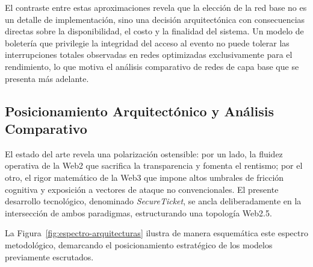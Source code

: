 El contraste entre estas aproximaciones revela que la elección de la red base no es un detalle de
implementación, sino una decisión arquitectónica con consecuencias directas sobre la disponibilidad, el
costo y la finalidad del sistema. Un modelo de boletería que privilegie la integridad del acceso al evento
no puede tolerar las interrupciones totales observadas en redes optimizadas exclusivamente para el
rendimiento, lo que motiva el análisis comparativo de redes de capa base que se presenta más adelante.

\subsection{Posicionamiento Arquitectónico y Análisis Comparativo}

El estado del arte revela una polarización ostensible: por un lado, la fluidez operativa de la Web2 que
sacrifica la transparencia y fomenta el rentismo; por el otro, el rigor matemático de la Web3 que impone
altos umbrales de fricción cognitiva y exposición a vectores de ataque no convencionales. El presente
desarrollo tecnológico, denominado \textit{SecureTicket}, se ancla deliberadamente en la intersección de
ambos paradigmas, estructurando una topología Web2.5.

La Figura~\ref{fig:espectro-arquitecturas} ilustra de manera esquemática este espectro metodológico,
demarcando el posicionamiento estratégico de los modelos previamente escrutados.


